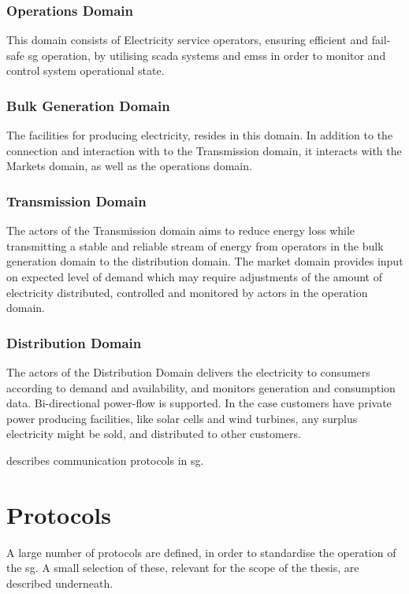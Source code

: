     \subsubsection{Operations Domain} This domain consists of Electricity service operators, ensuring efficient and fail-safe \acrfull{sg} operation, by utilising \acrshort{scada} systems and \acrlong{ems}s in order to monitor and control system operational state.  
    \subsubsection{Bulk Generation Domain} The facilities for producing electricity, resides in this domain. In addition to the connection and interaction with  to the Transmission domain, it interacts with the Markets domain, as well as the operations domain.  
    \subsubsection{Transmission Domain} The actors of the Transmission domain aims to reduce energy loss while transmitting a stable and reliable stream of energy from operators in the bulk generation domain to the distribution domain. The market domain provides input on expected level of demand which may require adjustments of the amount of electricity distributed, controlled and monitored by actors in the operation domain.  
    \subsubsection{Distribution Domain} The actors of the Distribution Domain delivers the electricity to consumers according to demand and availability, and monitors generation and consumption data. Bi-directional power-flow is supported. In the case customers have private  power producing facilities, like solar cells and wind turbines, any surplus electricity might be sold, and distributed to other customers.





\cite{2021arXiv210311657E} describes communication protocols in \acrshort{sg}.
\section{Protocols}
A large number of protocols are defined, in order to standardise the operation of the \acrlong{sg}.
A small selection of these, relevant for the scope of the thesis, are described underneath.


